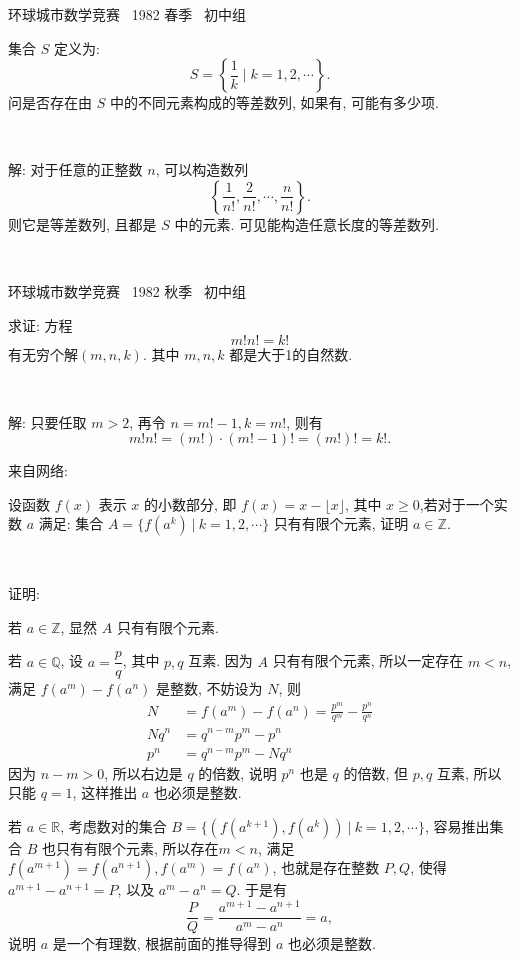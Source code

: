 \newpage

\noindent 环球城市数学竞赛~ 1982 春季~ 初中组

集合 $ S $ 定义为: \[ S = \left\{ \frac{1}{k} \mid k = 1, 2, \cdots \right\} .\] 问是否存在由 $ S $ 中的不同元素构成的等差数列, 如果有, 可能有多少项.

~

解: 对于任意的正整数 $ n $, 可以构造数列 \[ \left\{ \frac{1}{n!}, \frac{2}{n!}, \cdots, \frac{n}{n!} \right\}. \]
则它是等差数列, 且都是 $ S $ 中的元素. 可见能构造任意长度的等差数列.

~


\noindent 环球城市数学竞赛~ 1982 秋季~ 初中组

求证: 方程
\[m!n!=k!\]
有无穷个解$(m,n,k)$. 其中 $m,n,k$ 都是大于1的自然数.

~

解: 只要任取 $m>2$, 再令 $n = m!-1, k=m!$, 则有 
$$m!n!=(m!)\cdot(m!-1)!=(m!)!=k! .$$


\newpage

\noindent 来自网络:

设函数 $f(x)$ 表示 $x$ 的小数部分, 即 $f(x) = x - \lfloor x \rfloor$, 其中 $x\ge 0$,若对于一个实数 $a$ 满足: 集合 $A = \{ f(a^k)\ |\ k = 1,2,\cdots \}$ 只有有限个元素, 证明 $a\in \mathbb{Z}$.

~

\noindent 证明: 

若 $a\in \mathbb{Z}$, 显然 $A$ 只有有限个元素.

若 $a \in \mathbb{Q}$, 设 $a = \dfrac{p}{q}$, 其中 $p,q$ 互素. 因为 $A$ 只有有限个元素, 所以一定存在 $m < n$, 满足 $f(a^m) - f(a^n)$ 是整数, 不妨设为 $N$, 则
\begin{align*}
N &= f(a^m) - f(a^n) = \frac{p^m}{q^m} - \frac{p^n}{q^n}\\
Nq^n & = q^{n-m}p^m - p^n\\
p^n &= q^{n-m}p^m - Nq^n
\end{align*}
因为 $n-m > 0$, 所以右边是 $q$ 的倍数, 说明 $p^n$ 也是  $q$ 的倍数, 但 $p,q$ 互素, 所以只能 $q=1$, 这样推出 $a$ 也必须是整数. 

若 $a \in \mathbb{R}$, 考虑数对的集合 $B =  \{ (f(a^{k+1}),f(a^k))\ |\ k = 1,2,\cdots \}$, 容易推出集合 $B$ 也只有有限个元素, 所以存在$m < n$, 满足 $f(a^{m+1}) = f(a^{n+1}), f(a^m) = f(a^n)$, 也就是存在整数 $P,Q$, 使得 $a^{m+1} - a^{n+1} = P$, 以及 $a^m - a^n = Q$. 于是有
\[\frac{P}{Q} = \frac{a^{m+1} - a^{n+1}}{a^m - a^n} = a ,\]
说明 $a$ 是一个有理数, 根据前面的推导得到 $a$ 也必须是整数.

